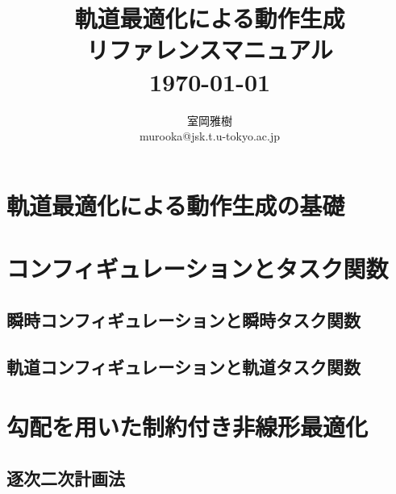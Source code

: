 \documentclass[]{jarticle}
\begin{document}
\newenvironment{refdesc}{
 \vspace{5mm} \parindent=0mm \topsep=0mm \parskip=0mm \leftmargin=10mm}{
             \parindent=10mm \topsep=3mm \parskip=1mm \leftmargin=0mm }


\date{}
\title{{\LARGE \bf 軌道最適化による動作生成 \\ リファレンスマニュアル} \\
\vspace{10mm}
{\large \today} \\
}

\author{
室岡雅樹 \\
murooka@jsk.t.u-tokyo.ac.jp \\
}

\thispagestyle{empty}
\maketitle
{}
\tableofcontents

\newpage
{}

\section{軌道最適化による動作生成の基礎} \label{chap:fundamental}


\section{コンフィギュレーションとタスク関数} \label{chap:config-task}
\subsection{瞬時コンフィギュレーションと瞬時タスク関数} \label{sec:instant-config-task}

\subsection{軌道コンフィギュレーションと軌道タスク関数} \label{sec:trajectory-config-task}


\section{勾配を用いた制約付き非線形最適化} \label{chap:sqp}
\subsection{逐次二次計画法} \label{sec:sqp}

\end{document}
